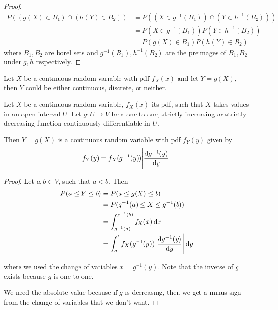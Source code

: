 \documentclass[12pt]{extarticle}
\begin{document}
\begin{proof}
    \skiplineafterproof
    \begin{align}
        P\left(
        (g(X) \in B_1) \cap (h(Y) \in B_2)
        \right) & = P\left(
        (X \in g^{-1}(B_1)) \cap (Y \in h^{-1}(B_2))
        \right)                                               \\
                & = P(X \in g^{-1}(B_1)) P(Y \in h^{-1}(B_2)) \\
                & = P(g(X) \in B_1) P(h(Y) \in B_2)
    \end{align}
    where $B_1, B_2$ are borel sets and $g^{-1}(B_1), h^{-1}(B_2)$ are the preimages of $B_1, B_2$ under $g, h$ respectively.
\end{proof}

\begin{remark}
    Let $X$ be a continuous random variable with pdf $f_X(x)$ and let $Y = g(X)$,
    then $Y$ could be either continuous, discrete, or neither.
\end{remark}

\begin{theorem}
    \label{thm:transformation_crv}

    Let $X$ be a continuous random variable, $f_X(x)$ its pdf, such that $X$ takes values in an open interval $U$.
    Let $g: U \to V$ be a one-to-one, strictly increasing or strictly decreasing function continuously differentiable in $U$.

    Then $Y = g(X)$ is a continuous random variable with pdf $f_Y(y)$ given by
    \begin{equation}
        f_Y(y) = f_X(g^{-1}(y)) \abs{\dv{g^{-1}(y)}{y}}
    \end{equation}
\end{theorem}

\begin{proof}
    Let $a, b \in V$, such that $a < b$.
    Then
    \begin{align}
        P(a \leq Y \leq b) & = P(a \leq g(X) \leq b)                                  \\
                           & = P(g^{-1}(a) \leq X \leq g^{-1}(b))                     \\
                           & = \int_{g^{-1}(a)}^{g^{-1}(b)} f_X(x) \dd{x}             \\
                           & = \int_a^b f_X(g^{-1}(y)) \abs{\dv{g^{-1}(y)}{y}} \dd{y}
    \end{align}

    where we used the change of variables $x = g^{-1}(y)$.
    Note that the inverse of $g$ exists because $g$ is one-to-one.

    We need the absolute value because if $g$ is decreasing, then we get a minus sign from the change of variables that we don't want.
\end{proof}
\end{document}
